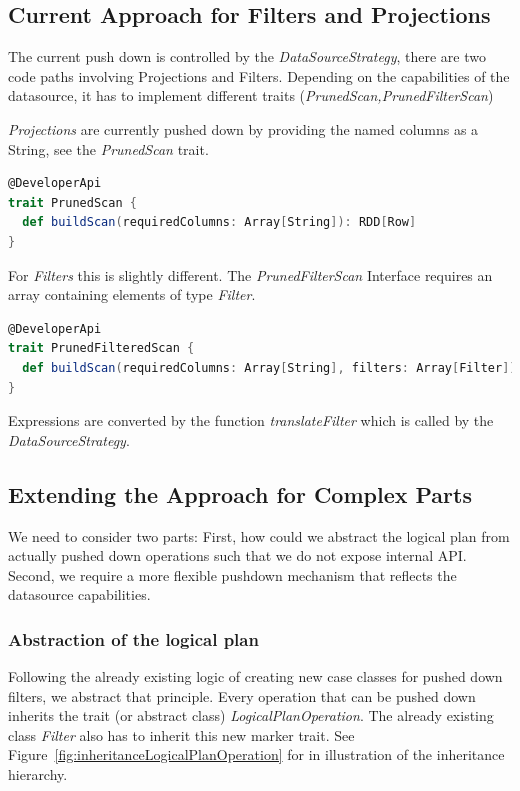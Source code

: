 \documentclass{article}
\begin{document}
\subsection{Current Approach for Filters and Projections}

The current push down is controlled by the \textit{DataSourceStrategy}, there are two code paths involving Projections and Filters. Depending on the capabilities of the datasource, it has to implement different traits (\textit{PrunedScan,PrunedFilterScan})

\textit{Projections} are currently pushed down by providing the named columns as a String, see the \textit{PrunedScan} trait.

\begin{lstlisting}[frame=none,language=scala]
@DeveloperApi
trait PrunedScan {
  def buildScan(requiredColumns: Array[String]): RDD[Row]
}
\end{lstlisting}

For \textit{Filters} this is slightly different. The \textit{PrunedFilterScan} Interface requires an array containing elements of type \textit{Filter}. 

\begin{lstlisting}[frame=none,language=scala]
@DeveloperApi
trait PrunedFilteredScan {
  def buildScan(requiredColumns: Array[String], filters: Array[Filter]): RDD[Row]
}
\end{lstlisting}

Expressions are converted by the function \textit{translateFilter} which is called by the \textit{DataSourceStrategy}.

\subsection{Extending the Approach for Complex Parts}

We need to consider two parts: First, how could we abstract the logical plan from actually pushed down operations such that we do not expose internal API. Second, we require a more flexible pushdown mechanism that reflects the datasource capabilities.

\subsubsection{Abstraction of the logical plan}

Following the already existing logic of creating new case classes for pushed down filters, we abstract that principle. Every operation that can be pushed down inherits the trait (or abstract class) \textit{LogicalPlanOperation}. The already existing class \textit{Filter} also has to inherit this new marker trait. See Figure~\ref{fig:inheritanceLogicalPlanOperation} for in illustration of the inheritance hierarchy.
\end{document}
